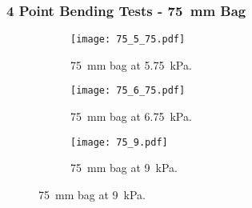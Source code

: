 \documentclass[serif, pdf]{beamer}
\begin{document}





\begin{frame}
\frametitle{4 Point Bending Tests - 75~mm Bag}
\begin{figure}[h!]
\begin{subfigure}{.5\textwidth}
  \centering
  \texttt{[image: 75\_5\_75.pdf]}
  \caption{\scriptsize{75~mm bag at 5.75~kPa.}}
  \label{fig:50_5_75_Numerical}
\end{subfigure}%
\begin{subfigure}{.5\textwidth}
  \centering
  \texttt{[image: 75\_6\_75.pdf]}
  \caption{\scriptsize{75~mm bag at 6.75~kPa.}}
  \label{fig:50_9_Numerical}
\end{subfigure}
\begin{subfigure}{\textwidth}
  \centering
  \texttt{[image: 75\_9.pdf]}
  \caption{\scriptsize{75~mm bag at 9~kPa.}}
  \label{fig:50_15_Numerical}
\end{subfigure}
\label{fig:50_Numerical}
\end{figure}
\end{frame}
\end{document}
